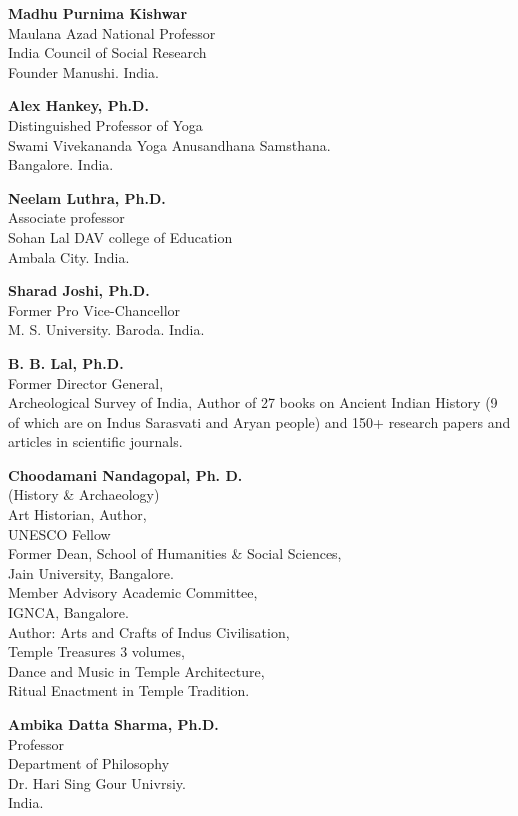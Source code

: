 \textbf{Madhu Purnima Kishwar}\\ 
Maulana Azad National Professor\\
India Council of Social Research\\
Founder Manushi. India.
\medskip
 
\textbf{Alex Hankey, Ph.D.}\\ 
Distinguished Professor of Yoga\\
Swami Vivekananda Yoga Anusandhana Samsthana.\\ 
Bangalore. India.
\medskip
 
\textbf{Neelam Luthra, Ph.D.}\\ 
Associate professor\\
Sohan Lal DAV college of Education\\
Ambala City. India.
\medskip
 
\textbf{Sharad Joshi, Ph.D.}\\ 
Former Pro Vice-Chancellor\\
M. S. University. Baroda. India.
\medskip

\textbf{B. B. Lal, Ph.D.}\\ 
Former Director General,\\ 
Archeological Survey of India,
Author of 27 books on Ancient Indian History (9 of which are on Indus Sarasvati and Aryan people) and 150+ research papers and articles in scientific journals. 
\medskip
 
\textbf{Choodamani Nandagopal, Ph. D.}\\ 
(History \& Archaeology)\\[2pt]
Art Historian, Author,\\[2pt]
UNESCO Fellow\\[2pt]
Former Dean, School of Humanities \& Social Sciences,\\ 
Jain University, Bangalore.\\[2pt]
Member Advisory Academic Committee,\\ 
IGNCA, Bangalore.\\[2pt]
Author: Arts and Crafts of Indus Civilisation,\\ 
Temple Treasures 3 volumes,\\[2pt]
Dance and Music in Temple Architecture,\\ 
Ritual Enactment in Temple Tradition.
\medskip
 

\textbf{Ambika Datta Sharma, Ph.D.}\\ 
Professor\\ 
Department of Philosophy\\
Dr. Hari Sing Gour Univrsiy.\\ 
India.
\medskip

